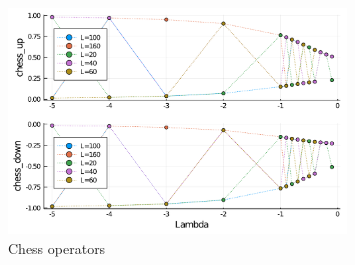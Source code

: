 \documentclass[12pt, a4paper, twoside, titlepage]{article}
\begin{document}
\begin{figure}[htp!]
  \centering
  \includegraphics[width=0.8\textwidth]{images/chessop.pdf}
  \caption{Chess operators}
  \label{}
\end{figure}
\end{document}

